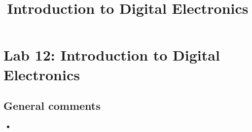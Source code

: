 \documentclass{article}
\title{Introduction to Digital Electronics}
\begin{document}
\maketitle

\section{Lab 12: Introduction to Digital Electronics}

\subsection*{General comments}

\begin{itemize}
\item
\end{itemize}
\end{document}
